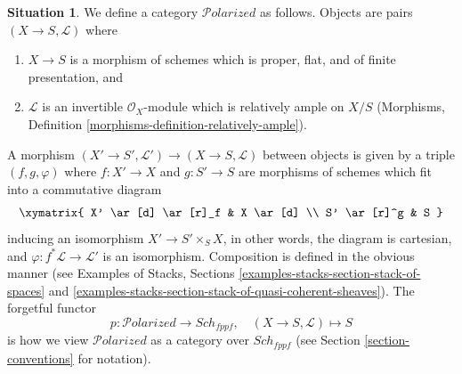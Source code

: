 \documentclass[10pt,a4paper]{amsart}
\theoremstyle{plain}
\theoremstyle{definition}
\newtheorem{situation}[subsection]{Situation}
\theoremstyle{remark}
\numberwithin{equation}{subsection}
\def\Sch{\mathit{Sch}}
\def\Polarizedstack{\mathcal{P}\!\mathit{olarized}}
\begin{document}
\begin{situation}
\label{situation-polarized}
We define a category $\Polarizedstack$ as follows. Objects are
pairs $(X \to S, \mathcal{L})$ where
\begin{enumerate}
\item $X \to S$ is a morphism of schemes which is proper, flat, and
of finite presentation, and
\item $\mathcal{L}$ is an invertible $\mathcal{O}_X$-module
which is relatively ample on $X/S$
(Morphisms, Definition \ref{morphisms-definition-relatively-ample}).
\end{enumerate}
A morphism $(X' \to S', \mathcal{L}') \to (X \to S, \mathcal{L})$
between objects
is given by a triple $(f, g, \varphi)$ where $f : X' \to X$ and $g : S' \to S$
are morphisms of schemes which fit into a commutative diagram
$$
\xymatrix{
X' \ar[d] \ar[r]_f & X \ar[d] \\
S' \ar[r]^g & S
}
$$
inducing an isomorphism $X' \to S' \times_S X$, in other words, the
diagram is cartesian,
and $\varphi : f^*\mathcal{L} \to \mathcal{L}'$ is an isomorphism.
Composition is defined in the obvious manner (see
Examples of Stacks, Sections
\ref{examples-stacks-section-stack-of-spaces} and
\ref{examples-stacks-section-stack-of-quasi-coherent-sheaves}).
The forgetful functor
$$
p : \Polarizedstack \longrightarrow \Sch_{fppf},\quad
(X \to S, \mathcal{L}) \longmapsto S
$$
is how we view $\Polarizedstack$ as a category over $\Sch_{fppf}$
(see Section \ref{section-conventions} for notation).
\end{situation}
\end{document}

